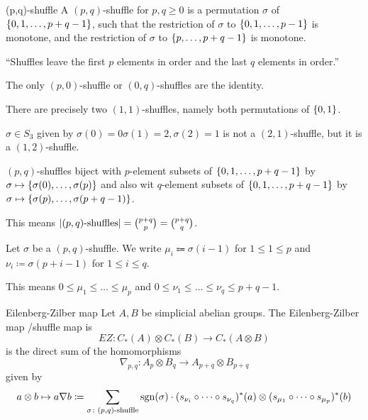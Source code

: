 \documentclass[language=english]{TemplateLecture}
\begin{document}
\begin{defi}{(p,q)-shuffle}{}
    A \((p,q)\)-shuffle for \(p,q \geq 0\) is a permutation \(\sigma\) of \(\{0,1,\dots, p+q-1\}\), such that the restriction of \(\sigma\) to \(\{0,1,\dots, p-1\}\) is monotone, and the restriction of \(\sigma\) to \(\{p, \dots, p+q-1\}\) is monotone.
\end{defi}

\begin{Remark}
    \enquote{Shuffles leave the first \(p\) elements in order and the last \(q\) elements in order.}
\end{Remark}

\begin{example}
    The only \((p,0)\)-shuffle or \((0,q)\)-shuffles are the identity.

    There are precisely two \((1,1)\)-shuffles, namely both permutations of \(\{0,1\}\).

    \(\sigma \in S_3\) given by \(\sigma(0) = 0 \sigma(1) = 2, \sigma(2) = 1\) is not a \((2,1)\)-shuffle, but it is a \((1,2)\)-shuffle.
\end{example}

\begin{remark}
    \((p,q)\)-shuffles biject with \(p\)-element subsets of \(\{0,1,\dots, p+q-1\}\) by \(\sigma\mapsto \{\sigma(0), \dots, \sigma(p)\}\) and also wit \(q\)-element subsets of \(\{0,1, \dots, p+q-1\}\) by \(\sigma\mapsto \{\sigma(p),\dots, \sigma(p+q-1)\}\).

    This means \(\lvert(p,q)\text{-shuffles}\rvert = \binom{p+q}{p} = \binom{p+q}{q}\).
\end{remark}

\begin{notation}
    Let \(\sigma\) be a \((p,q)\)-shuffle. We write \(\mu_i\Coloneq \sigma(i-1)\) for \(1 \leq 1 \leq p\) and \(\nu_i \coloneq \sigma(p+i-1)\) for \(1 \leq i \leq q\).

    This means
    \(0 \leq \mu_1 \leq \dots \leq \mu_p\) and \(0 \leq \nu_1 \leq \dots \leq \nu_q \leq p+q-1\).
\end{notation}

\begin{defi}{Eilenberg-Zilber map}{}
    Let \(A,B\) be simplicial abelian groups. The Eilenberg-Zilber map /shuffle map  is
    \[EZ\colon C_*(A) \otimes C_*(B) \to C_*(A\otimes B)\]
    is the direct sum of the homomorphisms
    \[\nabla_{p,q} \colon A_p\otimes B_q \to A_{p+q} \otimes B_{p+q}\]
    given by
    \[a\otimes b \mapsto a \nabla b \coloneq \sum_{\sigma\colon (p,q)\text{-shuffle}} \operatorname{sgn}(\sigma) \cdot (s_{\nu_i} \circ \dots \circ s_{\nu_q})^*(a) \otimes (s_{\mu_1}\circ \dots \circ s_{\mu_p})^*(b)\]
\end{defi}
\end{document}
